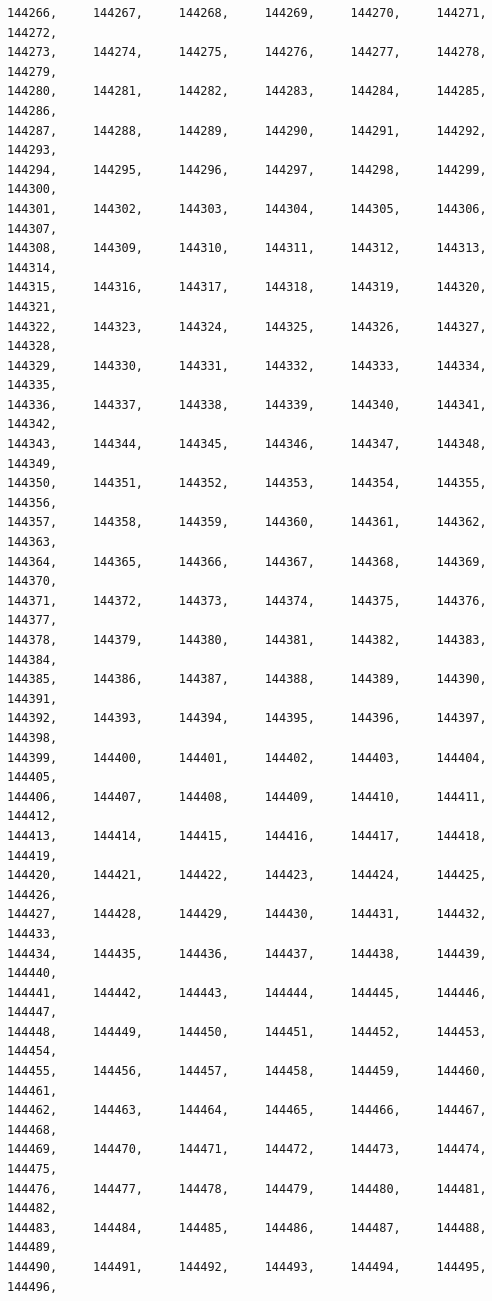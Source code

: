 \documentclass[a4paper,11pt]{report}
\begin{document}
\begin{verbatim}
144266,     144267,     144268,     144269,     144270,     144271,     144272,
144273,     144274,     144275,     144276,     144277,     144278,     144279,
144280,     144281,     144282,     144283,     144284,     144285,     144286,
144287,     144288,     144289,     144290,     144291,     144292,     144293,
144294,     144295,     144296,     144297,     144298,     144299,     144300,
144301,     144302,     144303,     144304,     144305,     144306,     144307,
144308,     144309,     144310,     144311,     144312,     144313,     144314,
144315,     144316,     144317,     144318,     144319,     144320,     144321,
144322,     144323,     144324,     144325,     144326,     144327,     144328,
144329,     144330,     144331,     144332,     144333,     144334,     144335,
144336,     144337,     144338,     144339,     144340,     144341,     144342,
144343,     144344,     144345,     144346,     144347,     144348,     144349,
144350,     144351,     144352,     144353,     144354,     144355,     144356,
144357,     144358,     144359,     144360,     144361,     144362,     144363,
144364,     144365,     144366,     144367,     144368,     144369,     144370,
144371,     144372,     144373,     144374,     144375,     144376,     144377,
144378,     144379,     144380,     144381,     144382,     144383,     144384,
144385,     144386,     144387,     144388,     144389,     144390,     144391,
144392,     144393,     144394,     144395,     144396,     144397,     144398,
144399,     144400,     144401,     144402,     144403,     144404,     144405,
144406,     144407,     144408,     144409,     144410,     144411,     144412,
144413,     144414,     144415,     144416,     144417,     144418,     144419,
144420,     144421,     144422,     144423,     144424,     144425,     144426,
144427,     144428,     144429,     144430,     144431,     144432,     144433,
144434,     144435,     144436,     144437,     144438,     144439,     144440,
144441,     144442,     144443,     144444,     144445,     144446,     144447,
144448,     144449,     144450,     144451,     144452,     144453,     144454,
144455,     144456,     144457,     144458,     144459,     144460,     144461,
144462,     144463,     144464,     144465,     144466,     144467,     144468,
144469,     144470,     144471,     144472,     144473,     144474,     144475,
144476,     144477,     144478,     144479,     144480,     144481,     144482,
144483,     144484,     144485,     144486,     144487,     144488,     144489,
144490,     144491,     144492,     144493,     144494,     144495,     144496,

\end{verbatim}
\end{document}
